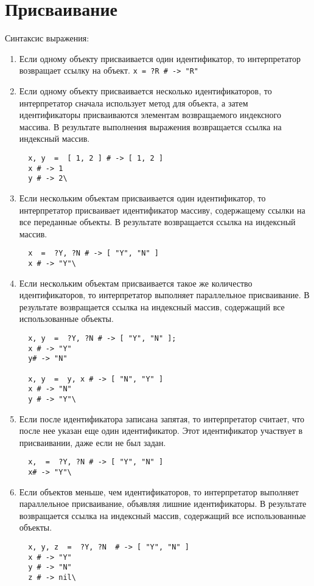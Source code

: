 \hypertarget{appequal}{}
\chapter{Присваивание}

Синтаксис выражения:
\begin{enumerate}
  \item Если одному объекту присваивается один идентификатор, то интерпретатор возвращает ссылку на объект.
  \verb!x = ?R # -> "R"!

  \item Если одному объекту присваивается несколько идентификаторов, то интерпретатор сначала использует метод  для объекта, а затем  идентификаторы присваиваются элементам возвращаемого индексного массива. В результате выполнения выражения возвращается ссылка на индексный массив.
  \begin{verbatim}
  x, y  =  [ 1, 2 ] # -> [ 1, 2 ]
  x # -> 1
  y # -> 2\
  \end{verbatim}

  \item Если нескольким объектам присваивается один идентификатор, то интерпретатор присваивает идентификатор массиву, содержащему ссылки на все переданные объекты. В результате возвращается ссылка на индексный массив.
  \begin{verbatim}
  x  =  ?Y, ?N # -> [ "Y", "N" ]
  x # -> "Y"\
  \end{verbatim}

  \item Если нескольким объектам присваивается такое же количество идентификаторов, то интерпретатор выполняет параллельное присваивание. В результате возвращается ссылка на индексный массив, содержащий все использованные объекты.
  \begin{verbatim}
  x, y  =  ?Y, ?N # -> [ "Y", "N" ];
  x # -> "Y"
  y# -> "N"

  x, y  =  y, x # -> [ "N", "Y" ]
  x # -> "N"
  y # -> "Y"\
  \end{verbatim}

  \item Если после идентификатора записана запятая, то интерпретатор считает, что после нее указан еще один идентификатор. Этот идентификатор участвует в присваивании, даже если не был задан.
  \begin{verbatim}
  x,  =  ?Y, ?N # -> [ "Y", "N" ]
  x# -> "Y"\
  \end{verbatim}
  
  \item Если объектов меньше, чем идентификаторов, то интерпретатор выполняет параллельное присваивание, объявляя лишние идентификаторы. В результате возвращается ссылка на индексный массив, содержащий все использованные объекты.
  \begin{verbatim}
  x, y, z  =  ?Y, ?N  # -> [ "Y", "N" ]
  x # -> "Y"
  y # -> "N"
  z # -> nil\
  \end{verbatim}


\end{enumerate}
